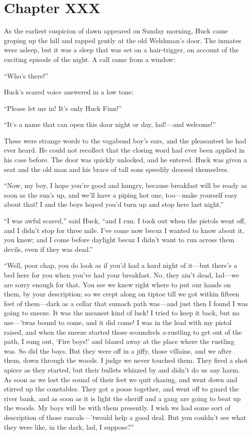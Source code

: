 \documentclass{book}
\begin{document}
\chapter*{Chapter XXX}

As the earliest suspicion of dawn appeared on Sunday morning, Huck came groping up the hill and rapped gently at the old Welshman’s door. The inmates were asleep, but it was a sleep that was set on a hair-trigger, on account of the exciting episode of the night. A call came from a window:

“Who’s there!”

Huck’s scared voice answered in a low tone:

“Please let me in! It’s only Huck Finn!”

“It’s a name that can open this door night or day, lad!—and welcome!”

These were strange words to the vagabond boy’s ears, and the pleasantest he had ever heard. He could not recollect that the closing word had ever been applied in his case before. The door was quickly unlocked, and he entered. Huck was given a seat and the old man and his brace of tall sons speedily dressed themselves.

“Now, my boy, I hope you’re good and hungry, because breakfast will be ready as soon as the sun’s up, and we’ll have a piping hot one, too—make yourself easy about that! I and the boys hoped you’d turn up and stop here last night.”

“I was awful scared,” said Huck, “and I run. I took out when the pistols went off, and I didn’t stop for three mile. I’ve come now becuz I wanted to know about it, you know; and I come before daylight becuz I didn’t want to run across them devils, even if they was dead.”

“Well, poor chap, you do look as if you’d had a hard night of it—but there’s a bed here for you when you’ve had your breakfast. No, they ain’t dead, lad—we are sorry enough for that. You see we knew right where to put our hands on them, by your description; so we crept along on tiptoe till we got within fifteen feet of them—dark as a cellar that sumach path was—and just then I found I was going to sneeze. It was the meanest kind of luck! I tried to keep it back, but no use—’twas bound to come, and it did come! I was in the lead with my pistol raised, and when the sneeze started those scoundrels a-rustling to get out of the path, I sung out, ‘Fire boys!’ and blazed away at the place where the rustling was. So did the boys. But they were off in a jiffy, those villains, and we after them, down through the woods. I judge we never touched them. They fired a shot apiece as they started, but their bullets whizzed by and didn’t do us any harm. As soon as we lost the sound of their feet we quit chasing, and went down and stirred up the constables. They got a posse together, and went off to guard the river bank, and as soon as it is light the sheriff and a gang are going to beat up the woods. My boys will be with them presently. I wish we had some sort of description of those rascals—’twould help a good deal. But you couldn’t see what they were like, in the dark, lad, I suppose?”
\end{document}
